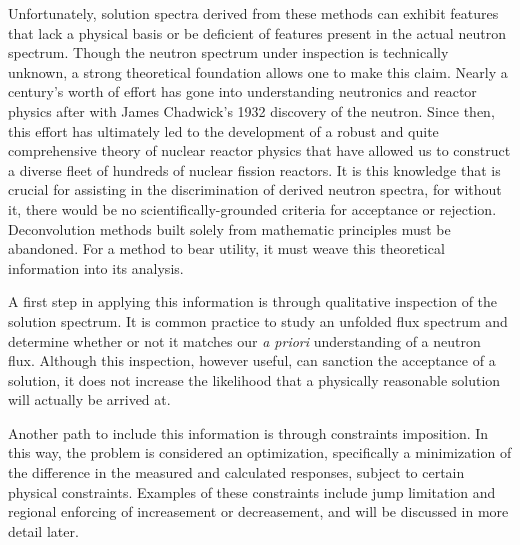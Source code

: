Unfortunately, solution spectra derived from these methods can exhibit features that lack a physical basis or be deficient of features present in the actual neutron spectrum.
Though the neutron spectrum under inspection is technically unknown, a strong theoretical foundation allows one to make this claim.
Nearly a century's worth of effort has gone into understanding neutronics and reactor physics after with James Chadwick's 1932 discovery of the neutron.
Since then, this effort has ultimately led to the development of a robust and quite comprehensive theory of nuclear reactor physics that have allowed us to construct a diverse fleet of hundreds of nuclear fission reactors.
It is this knowledge that is crucial for assisting in the discrimination of derived neutron spectra, for without it, there would be no scientifically-grounded criteria for acceptance or rejection.
Deconvolution methods built solely from mathematic principles must be abandoned.
For a method to bear utility, it must weave this theoretical information into its analysis.

A first step in applying this information is through qualitative inspection of the solution spectrum.
It is common practice to study an unfolded flux spectrum and determine whether or not it matches our {\it a priori} understanding of a neutron flux.
Although this inspection, however useful, can sanction the acceptance of a solution, it does not increase the likelihood that a physically reasonable solution will actually be arrived at.

Another path to include this information is through constraints imposition.
In this way, the problem is considered an optimization, specifically a minimization of the difference in the measured and calculated responses, subject to certain physical constraints.
Examples of these constraints include jump limitation and regional enforcing of increasement or decreasement, and will be discussed in more detail later.

